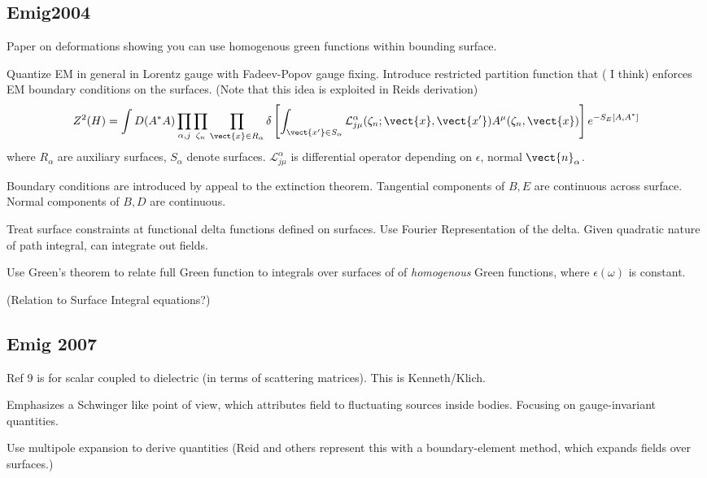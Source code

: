 \subsection{Emig2004}

Paper on deformations showing you can use homogenous green functions within bounding surface.  
\cite{Emig2004}

Quantize EM in general in Lorentz gauge with Fadeev-Popov gauge fixing.  
Introduce restricted partition function that ( I think) enforces EM boundary
conditions on the surfaces. (Note that this idea is exploited in Reids derivation)
\begin{equation}
Z^2(H)=\int D(A^*A)\prod_{\alpha,j}\prod_{\zeta_n}\prod_{\vect{x}\in R_\alpha}
\delta\left[\int_{\vect{x'}\in S_\alpha} \mathcal{L}^\alpha_{j\mu}(\zeta_n;\vect{x},\vect{x'})
  A^\mu(\zeta_n,\vect{x})\right]e^{-S_E[A,A^*]}
\end{equation}
where $R_\alpha$ are auxiliary surfaces, $S_\alpha$ denote surfaces.
$\mathcal{L}^\alpha_{j\mu}$ is differential operator depending on $\epsilon$, normal $\vect{n}_\alpha$.  

Boundary conditions are introduced by appeal to the extinction theorem.  
Tangential components of $B, E$ are continuous across surface.
Normal components of $B, D$ are continuous.

Treat surface constraints at functional delta functions defined on surfaces.
Use Fourier Representation of the delta.  Given quadratic  nature of path integral,
can integrate out fields.

Use Green's theorem to relate full Green function to integrals over surfaces
of of \emph{homogenous} Green functions, where $\epsilon(\omega)$ is constant.  

(Relation to Surface Integral equations?)

\subsection{Emig 2007}
\cite{Emig2007}

Ref 9 is for scalar coupled to dielectric (in terms of scattering matrices).
This is Kenneth/Klich.

Emphasizes a Schwinger like point of view, which attributes field to fluctuating
sources inside bodies.  
Focusing on gauge-invariant quantities.  

Use multipole expansion to derive quantities (Reid and others represent this
with a boundary-element method, which expands fields over surfaces.)

